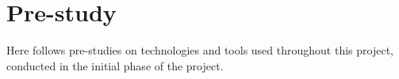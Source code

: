 \chapter{Pre-study}

Here follows pre-studies on technologies and tools used throughout this project, conducted in the initial phase of the project.
